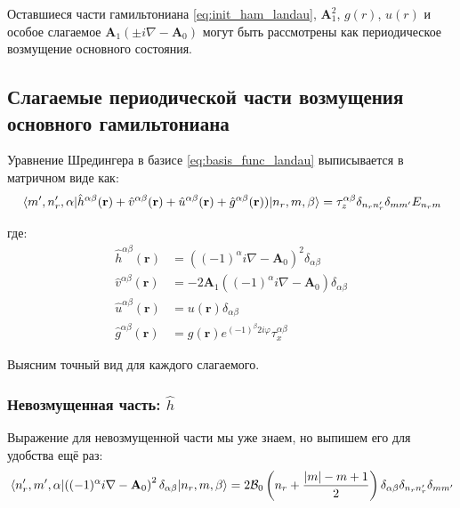 \documentclass[a4paper,article,14pt]{extarticle}
\begin{document}
Оставшиеся части гамильтониана \eqref{eq:init_ham_landau}, $\mathbf{A}_1^2$, $g(r)$, $u(r)$ и особое слагаемое 
$\mathbf{A}_1  (\pm i \nabla - \mathbf{A}_0 )$ могут быть рассмотрены как периодическое возмущение основного состояния.


\subsection{Слагаемые периодической части возмущения основного гамильтониана}

Уравнение Шредингера в базисе \eqref{eq:basis_func_landau} выписывается в матричном виде как:
\begin{equation}
\label{eq:shred_final}
\mel{m', n'_r, \alpha}{\hat h^{\alpha \beta}(\mathbf{r}) + \hat v^{\alpha \beta}(\mathbf{r}) + \hat u^{\alpha \beta}(\mathbf{r}) + \hat g^{\alpha \beta} (\mathbf{r})) }{n_r,m, \beta} = {\tau_z^{\alpha \beta} \delta_{n_r n'_r} \delta_{m m'} E_{n_r m} }
\end{equation}

\noindent где:
\begin{equation}
\label{eq:definitions}
\begin{aligned}
\hat h^{\alpha \beta}(\mathbf{r})   &= \left( (-1)^\alpha i \nabla - \mathbf{A}_0 \right) ^ 2 \delta_{\alpha \beta} \\
\hat v^{\alpha \beta}(\mathbf{r})   &= - 2 \mathbf{A}_1 \left( (-1)^{\alpha} i \nabla - \mathbf{A}_0 \right) \delta_{\alpha \beta} \\
\hat u^{\alpha \beta}(\mathbf{r})   &= u(\mathbf{r})  \delta_{\alpha \beta}\\
\hat g^{\alpha \beta} (\mathbf{r}) &=   g(\mathbf{r})  e^{ (-1)^{\beta} 2  i   \varphi} \tau^{\alpha \beta}_x 
\end{aligned}
\end{equation}

\noindent Выясним точный вид для каждого слагаемого. 

\subsubsection{Невозмущенная часть: $\hat h$}
Выражение для невозмущенной части мы уже знаем, но выпишем его для удобства ещё раз:
\begin{equation}
\mel{n'_r, m', \alpha} {\left((-1)^\alpha i \nabla - \mathbf{A}_0 \right) ^ 2 \delta_{\alpha \beta}} {n_r, m, \beta} = 
2 {\cal B}_{0} \left( n_r + \frac{|m| - m + 1}{2} \right) \delta_{\alpha \beta} \delta_{n_r n'_r} \delta_{m m'} 
\end{equation}
\end{document}
